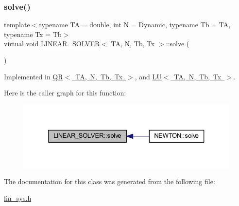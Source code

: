\subsubsection{\texorpdfstring{solve()}{solve()}}
{\footnotesize\ttfamily template$<$typename TA = double, int N = Dynamic, typename Tb = TA, typename Tx = Tb$>$ \\
virtual void \mbox{\hyperlink{class_l_i_n_e_a_r___s_o_l_v_e_r}{L\+I\+N\+E\+A\+R\+\_\+\+S\+O\+L\+V\+ER}}$<$ TA, N, Tb, Tx $>$\+::solve (\begin{DoxyParamCaption}\item[{\mbox{\hyperlink{class_l_i_n_e_a_r___s_y_s_t_e_m}{L\+I\+N\+E\+A\+R\+\_\+\+S\+Y\+S\+T\+EM}}$<$ TA, N, Tb, Tx $>$ \&}]{ }\end{DoxyParamCaption})\hspace{0.3cm}{\ttfamily [pure virtual]}}



Implemented in \mbox{\hyperlink{class_q_r_ab8f49cec36214bdcd9fca78e89c3737e}{Q\+R$<$ T\+A, N, Tb, Tx $>$}}, and \mbox{\hyperlink{class_l_u_a624d7ff38645debae206313534516f49}{L\+U$<$ T\+A, N, Tb, Tx $>$}}.

Here is the caller graph for this function\+:\nopagebreak
\begin{figure}[H]
\begin{center}
\leavevmode
\includegraphics[width=327pt]{class_l_i_n_e_a_r___s_o_l_v_e_r_a83c4d3b280e57814ec091dd9f8927c24_icgraph}
\end{center}
\end{figure}


The documentation for this class was generated from the following file\+:\begin{DoxyCompactItemize}
\item 
\mbox{\hyperlink{lin__sys_8h}{lin\+\_\+sys.\+h}}\end{DoxyCompactItemize}
